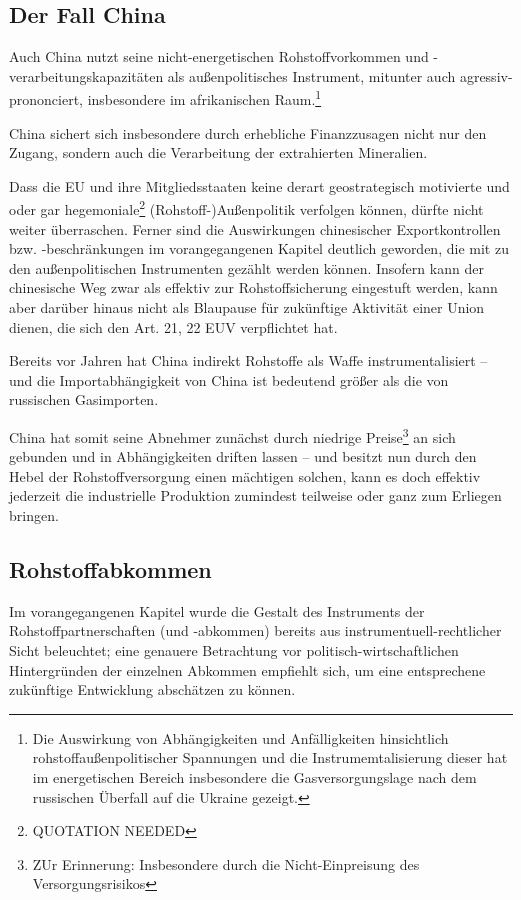 \documentclass[12pt,a4paper,oneside]{book} %
\begin{document}
\subsection{Der Fall China}


Auch China nutzt seine nicht-energetischen Rohstoffvorkommen und -verarbeitungskapazitäten als außenpolitisches Instrument, mitunter auch agressiv-prononciert, insbesondere im afrikanischen Raum.\footnote{Die Auswirkung von Abhängigkeiten und Anfälligkeiten hinsichtlich rohstoffaußenpolitischer Spannungen und die Instrumemtalisierung dieser hat im energetischen Bereich insbesondere die Gasversorgungslage nach dem russischen Überfall auf die Ukraine gezeigt.} 

China sichert sich insbesondere durch erhebliche Finanzzusagen nicht nur den Zugang, sondern auch die Verarbeitung der extrahierten Mineralien.


Dass die EU und ihre Mitgliedsstaaten keine derart geostrategisch motivierte und oder gar hegemoniale\footnote{QUOTATION NEEDED} (Rohstoff-)Außenpolitik verfolgen können, dürfte nicht weiter überraschen. Ferner sind die Auswirkungen chinesischer Exportkontrollen bzw. -beschränkungen im vorangegangenen Kapitel deutlich geworden, die mit zu den außenpolitischen Instrumenten gezählt werden können. Insofern kann der chinesische Weg zwar als effektiv zur Rohstoffsicherung eingestuft werden, kann aber darüber hinaus nicht als Blaupause für zukünftige Aktivität einer Union dienen, die sich den Art. 21, 22 EUV verpflichtet hat.

Bereits vor Jahren hat China indirekt Rohstoffe als Waffe instrumentalisiert -- und die Importabhängigkeit von China ist bedeutend größer als die von russischen Gasimporten.\autocite{BDI. Rohstoffkongress: Deutschland braucht eine strategische Rohstoffpolitik}

China hat somit seine Abnehmer zunächst durch niedrige Preise\footnote{ZUr Erinnerung: Insbesondere durch die Nicht-Einpreisung des Versorgungsrisikos} an sich gebunden und in Abhängigkeiten driften lassen -- und besitzt nun durch den Hebel der Rohstoffversorgung einen mächtigen solchen, kann es doch effektiv jederzeit die industrielle Produktion zumindest teilweise oder ganz zum Erliegen bringen.


\subsection{Rohstoffabkommen}
Im vorangegangenen Kapitel wurde die Gestalt des Instruments der Rohstoffpartnerschaften (und -abkommen) bereits aus instrumentuell-rechtlicher Sicht beleuchtet; eine genauere Betrachtung vor politisch-wirtschaftlichen Hintergründen der einzelnen Abkommen empfiehlt sich, um eine entsprechene zukünftige Entwicklung abschätzen zu können.
\end{document}
